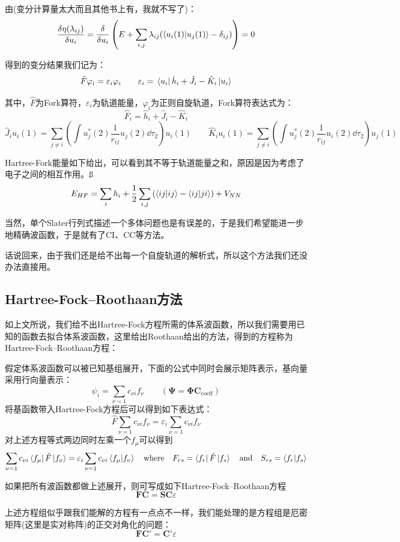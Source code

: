 由(变分计算量太大而且其他书上有，我就不写了)：
\[\frac{\delta\eta(\lambda_{ij})}{\delta u_i}=\frac{\delta}{\delta u_i}\left(E+\sum_{i,j}\lambda_{ij}(\bra{u_i(1)}\ket{u_j(1)}-\delta_{ij})\right)=0\]

得到的变分结果我们记为：
\[\hat{F}\varphi_i=\varepsilon_i\varphi_i \qquad \varepsilon_i=\bra*{u_i}\hat{h}_i+\hat{J}_i-\hat{K}_i\ket*{u_i}\]

其中，$\hat{F}$为Fork算符，$\varepsilon_i$为轨道能量，$\varphi_i$为正则自旋轨道，Fork算符表达式为：
\[\hat{F}_i = \hat{h}_i + \hat{J}_i - \hat{K}_i\]
\[\hat{J}_iu_i(1) = \sum_{j \neq i}\left(\int u_j^*(2)\frac{1}{r_{ij}}u_j(2)\dd{\tau}_2\right)u_i(1) \qquad \hat{K}_iu_i(1) = \sum_{j \neq i}\left(\int u_j^*(2)\frac{1}{r_{ij}}u_i(2)\dd{\tau}_2\right)u_j(1)\]

Hartree-Fork能量如下给出，可以看到其不等于轨道能量之和，原因是因为考虑了电子之间的相互作用。ß
\[E_{HF}=\sum_ih_i+\frac{1}{2}\sum_{i,j}\left(\bra{ij}\ket{ij}-\bra{ij}\ket{ji}\right)+V_{NN}\]

当然，单个Slater行列式描述一个多体问题也是有误差的，于是我们希望能进一步地精确波函数，于是就有了CI、CC等方法。

话说回来，由于我们还是给不出每一个自旋轨道的解析式，所以这个方法我们还没办法直接用。

\subsection{Hartree-Fock–Roothaan方法}
如上文所说，我们给不出Hartree-Fock方程所需的体系波函数，所以我们需要用已知的函数去拟合体系波函数，这里给出Roothaan给出的方法，得到的方程称为Hartree-Fock–Roothaan方程：

假定体系波函数可以被已知基组展开，下面的公式中同时会展示矩阵表示，基向量采用行向量表示：
\[\psi_i=\sum_{\nu=1}c_{\nu i}f_{\nu} \qquad (\mathbf{\Psi} = \mathbf{\Phi} \mathbf{C}_{\text{coeff}})\]
将基函数带入Hartree-Fock方程后可以得到如下表达式：
\[\hat{F}\sum_{\nu=1}c_{\nu i}f_{\nu}=\varepsilon_i\sum_{\nu=1}c_{\nu i}f_{\nu}\]
对上述方程等式两边同时左乘一个$f_{\mu}$可以得到
\[\sum_{\nu=1}c_{\nu i}\bra{f_{\mu}}\hat{F}\ket{f_{\nu}}=\varepsilon_i\sum_{\nu=1}c_{\nu i}\bra{f_{\mu}}\ket{f_{\nu}} \quad \text{where} \quad F_{rs}=\bra{f_r}\hat{F}\ket{f_s} \quad \text{and} \quad S_{rs}=\bra{f_r}\ket{f_s}\]

如果把所有波函数都做上述展开，则可写成如下Hartree-Fock–Roothaan方程
\[\mathbf{F}\mathbf{C}=\mathbf{S}\mathbf{C}\varepsilon\]

上述方程组似乎跟我们能解的方程有一点点不一样，我们能处理的是方程组是厄密矩阵(这里是实对称阵)的正交对角化的问题：
\[\mathbf{F}\mathbf{C}'=\mathbf{C}'\varepsilon\]

